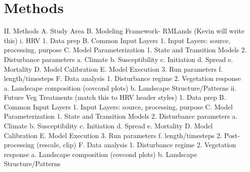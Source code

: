 \chapter{Methods}
II. Methods
	A. Study Area
	B. Modeling Framework- RMLands (Kevin will write this)
	i. HRV
		1. Data prep
			B. Common Input Layers
				1. Input Layers: source, processing, purpose
		C. Model Parameterization
				1. State and Transition Models
				2. Disturbance parameters
					a. Climate
					b. Susceptibility
					c. Initiation
					d. Spread
					e. Mortality
		D. Model Calibration
		E. Model Execution
			3. Run parameters
				f. length/timesteps
		F. Data analysis
			1. Disturbance regime
			2. Vegetation response 
				a. Landscape composition (covcond plots)
				b. Landscape Structure/Patterns
	ii. Future Veg Treatments (match this to HRV header styles)
		1. Data prep
			B. Common Input Layers
				1. Input Layers: source, processing, purpose
		C. Model Parameterization
				1. State and Transition Models
				2. Disturbance parameters
					a. Climate
					b. Susceptibility
					c. Initiation
					d. Spread
					e. Mortality
		D. Model Calibration
		E. Model Execution
			3. Run parameters
				f. length/timesteps
			2. Post-processing (rescale, clip)
		F. Data analysis
			1. Disturbance regime
			2. Vegetation response 
				a. Landscape composition (covcond plots)
				b. Landscape Structure/Patterns

